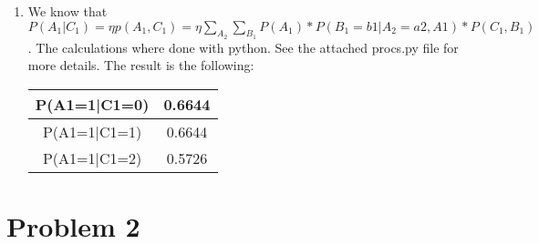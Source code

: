 \documentclass{article}
\begin{document}
\begin{enumerate}
\item{
  
  We know that $P(A_1|C_1)= \eta p(A_1,C_1)=\eta \sum_{A_2}\sum_{B_1}P(A_1)*P(B_1=b1|A_2=a2,A1)*P(C_1,B_1)$. The calculations where done with python. See the attached procs.py file for more details. The result is the following:

  \begin{tabular}{|c|c|}
    \hline
    P(A1=1|C1=0) & 0.6644 \\
    \hline
    P(A1=1|C1=1) & 0.6644 \\
    \hline
    P(A1=1|C1=2) & 0.5726 \\
    \hline
  \end{tabular}
}

\end{enumerate}

\section{Problem 2}
\end{document}
